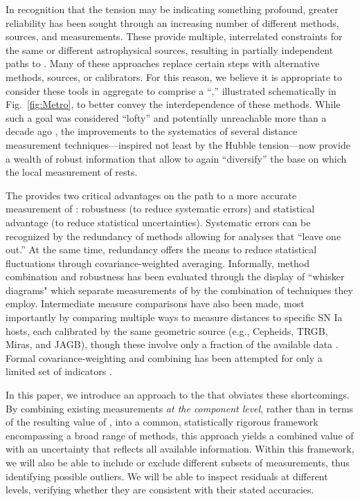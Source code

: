 In recognition that the tension may be indicating something profound, greater reliability has been sought through an increasing number of different methods, sources, and measurements. These provide multiple, interrelated constraints for the same or different astrophysical sources, resulting in partially independent paths to {\Hcst}. Many of these approaches replace certain steps with alternative methods, sources, or calibrators. For this reason, we believe it is appropriate to consider these tools in aggregate to comprise a ``{\DN},'' illustrated schematically in Fig.~\ref{fig:Metro}, to better convey the interdependence of these methods. While such a goal was considered ``lofty'' and potentially unreachable more than a decade ago \citep[cf.][and Fig.\,1 therein, originally credited to \citealt{2006pnbm.conf...79C}]{2013IAUS..289..351D}, the improvements to the systematics of several distance measurement techniques\hbox{---}inspired not least by the Hubble tension\hbox{---}now provide a wealth of robust information that allow to again ``diversify'' the base on which the local measurement of \Hcst{} rests.

The {\DN} provides two critical advantages on the path to a more accurate measurement of {\Hcst}: robustness (to reduce systematic errors) and statistical advantage (to reduce statistical uncertainties). Systematic errors can be recognized by the redundancy of methods allowing for analyses that ``leave one out.''  At the same time, redundancy offers the means to reduce statistical fluctuations through covariance-weighted averaging.  Informally, method combination and robustness has been evaluated through the display of ``whisker diagrams" which separate measurements of {\Hcst} by the combination of techniques they employ.  Intermediate measure comparisons have also been made, most importantly by comparing multiple ways to measure distances to specific SN Ia hosts, each calibrated by the same geometric source (e.g., Cepheids, TRGB, Miras, and JAGB), though these involve only a fraction of the available data \citep{2024ApJ...977..120R}. Formal covariance-weighting and combining has been attempted for only a limited set of indicators \citep{2022ApJ...934L...7R}. 

In this paper, we introduce an approach to the {\DN} that obviates these shortcomings.  By combining existing measurements \textit{at the component level}, rather than in terms of the resulting value of \Hcst, into a common, statistically rigorous framework encompassing a broad range of methods,  this approach yields a combined value of {\Hcst} with an uncertainty that reflects all available information.  Within this framework, we will also be able to include or exclude different subsets of measurements, thus identifying possible outliers. We will be able to inspect residuals at different levels, verifying whether they are consistent with their stated accuracies.  


